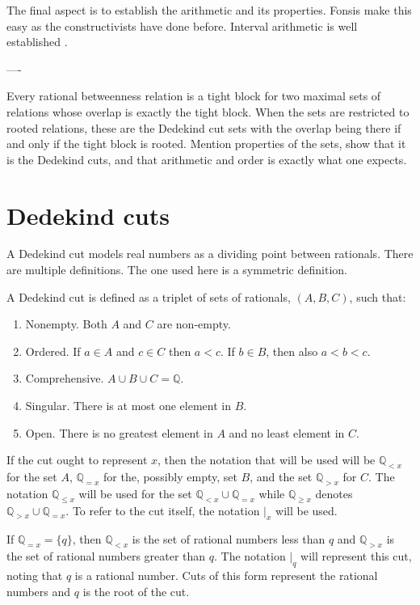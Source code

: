 \documentclass[12pt]{article}
\newcommand{\qcut}[2][x]{\ensuremath{\mathbb{Q}_{#2 #1}}}
\newcommand{\qlt}[1][x]{\qcut[#1]{<}}
\newcommand{\qeq}[1][x]{\qcut[#1]{=}}
\newcommand{\qgt}[1][x]{\qcut[#1]{>}}
\newcommand{\qgeq}[1][x]{\qcut[#1]{\geq}}
\newcommand{\qleq}[1][x]{\qcut[#1]{\leq}}
\newcommand{\cut}[1][x]{{\vert}_{#1} }
\begin{document}
The final aspect is to establish the arithmetic and its properties. Fonsis make this easy as the constructivists have done before. Interval arithmetic is well established \cite{moore}. 



----

Every rational betweenness relation is a tight block for two maximal sets of relations whose overlap is exactly the tight block. When the sets are restricted to rooted relations, these are the Dedekind cut sets with the overlap being there if and only if the tight block is rooted. Mention properties of the sets, show that it is the Dedekind cuts, and that arithmetic and order is exactly what one expects. 

\section{Dedekind cuts}

A Dedekind cut models real numbers as a dividing point between rationals. There are multiple definitions. The one used here is a symmetric definition. 

A Dedekind cut is defined as a triplet of sets of rationals, $(A, B, C)$, such that: 
\begin{enumerate}
    \item Nonempty. Both $A$ and $C$ are non-empty.
    \item Ordered. If $a \in A$ and $c \in C$ then $a < c$. If $b \in B$, then also $a < b < c$. 
    \item Comprehensive. $A \cup B \cup C = \mathbb{Q}$.
    \item Singular. There is at most one element in $B$.
    \item Open. There is no greatest element in $A$ and no least element in $C$.
\end{enumerate}
If the cut ought to represent $x$, then the notation that will be used will be $\qlt$ for the set $A$, $\qeq$ for the, possibly empty, set $B$, and the set $\qgt$ for $C$. The notation $\qleq$ will be used for the set $\qlt \cup \qeq$ while $\qgeq$ denotes $\qgt \cup \qeq$. To refer to the cut itself, the notation $\cut$ will be used. 



If $\qeq = \{q\}$, then $\qlt$ is the set of rational numbers less than $q$ and $\qgt$ is the set of rational numbers greater than $q$. The notation $\cut[q]$ will represent this cut, noting that $q$ is a rational number. Cuts of this form represent the rational numbers and $q$ is the root of the cut. 
\end{document}
